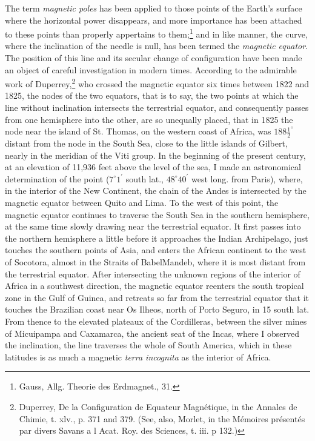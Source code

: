 The term \emph{magnetic poles} has been applied to those points of the Earth's surface where the horizontal power disappears, and more importance has been attached to these points than properly appertains to them;\footnote{Gauss, Allg. Theorie des Erdmagnet.,  31.} and in like manner, the curve, where the inclination of the needle is null, has been termed the \emph{magnetic equator}. The position of this line and its secular change of configuration have been made an object of careful investigation in modern times. According to the admirable work of Duperrey,\footnote{Duperrey, De la Configuration de  Equateur Magn\'{e}tique, in the Annales de Chimie, t. xlv., p. 371 and 379. (See, also, Morlet, in the M\'{e}moires pr\'{e}sent\'{e}s par divers Savans a l Acat. Roy. des Sciences, t. iii. p 132.)} who crossed the magnetic equator six times between 1822 and 1825, the nodes of the two equators, that is to say, the two points at which the line without inclination intersects the terrestrial equator, and consequently passes from one hemisphere into the other, are so unequally placed, that in 1825 the node near the island of St. Thomas, on the western coast of Africa, was $188\frac{1}{2}^\circ$ distant from the node in the South Sea, close to the little islands of Gilbert, nearly in the meridian of the Viti group. In the beginning of the present century, at an elevation of 11,936 feet above the level of the sea, I made an astronomical determination of the point ($7^\circ 1^\prime$ south lat., $48^\circ 40^\prime$ west long. from Paris), where, in the interior of the New Continent, the chain of the Andes is intersected by the magnetic equator between Quito and Lima. To the west of this point, the magnetic equator continues to traverse the South Sea in the southern hemisphere, at the same time slowly drawing near the terrestrial equator. It first passes into the northern hemisphere a little before it approaches the Indian Archipelago, just touches the southern points of Asia, and enters the African continent to the west of Socotora, almost in the Straits of BabelMandeb, where it is most distant from the terrestrial equator. After intersecting the unknown regions of the interior of Africa in a southwest direction, the magnetic equator reenters the south tropical zone in the Gulf of Guinea, and retreats so far from the terrestrial equator that it touches the Brazilian coast near Os Ilheos, north of Porto Seguro, in 15 south lat. From thence to the elevated plateaux of the Cordilleras, between the silver mines of Micuipampa and Caxamarca, the ancient seat of the Incas, where I observed the inclination, the line traverses the whole of South America, which in these latitudes is as much a magnetic \emph{terra incognita} as the interior of Africa.

